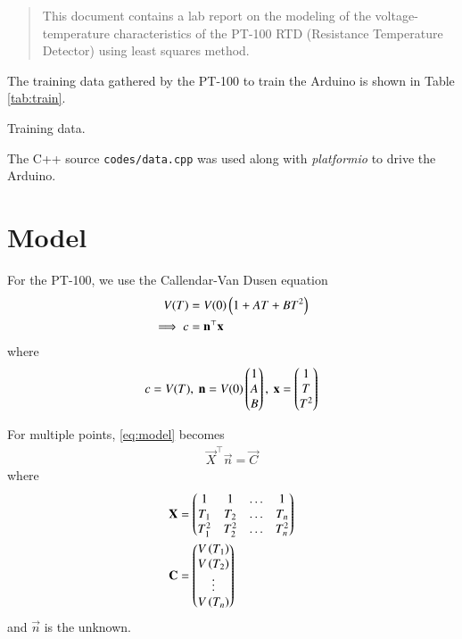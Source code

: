 \documentclass[journal,12pt,twocolumn]{IEEEtran}
\begin{document}
\begin{abstract}
    This document contains a lab report on the modeling of the voltage-temperature
    characteristics of the PT-100 RTD (Resistance Temperature Detector) using
    least squares method.
\end{abstract}

The training data gathered by the PT-100 to train the Arduino is shown in Table 
\ref{tab:train}.

\begin{table}[!ht]
    \centering
    
    \caption{Training data.}
    \label{tab:train}
\end{table}

The C++ source \texttt{codes/data.cpp} was used along with \textit{platformio}
to drive the Arduino.

\section{Model}

For the PT-100, we use the Callendar-Van Dusen equation
\begin{align}
    V(T) &= V(0)\left(1+AT+BT^2\right) \\
    \implies c &= \boldsymbol{\mathbf{n}}^\top\boldsymbol{\mathbf{x}} \label{eq:model}
\end{align}
where
\begin{align}
    c = V(T),\ \boldsymbol{\mathbf{n}} = V(0)\begin{pmatrix}1\\A\\B\end{pmatrix},\ \boldsymbol{\mathbf{x}} = \begin{pmatrix}1\\T\\T^2\end{pmatrix}
    \label{eq:x-y-theta-def}
\end{align}

For multiple points, \eqref{eq:model} becomes
\begin{align}
    \vec{X}^\top\vec{n} = \vec{C}
    \label{eq:lsq-eqn}
\end{align}
where
\begin{align}
    \boldsymbol{\mathbf{X}} &= \begin{pmatrix}1&1&\ldots&1\\T_1&T_2&\ldots&T_n\\T_1^2&T_2^2&\ldots&T_n^2\end{pmatrix} \\
    \boldsymbol{\mathbf{C}} &= \begin{pmatrix}V\left(T_1\right)\\V\left(T_2\right)\\\vdots\\V\left(T_n\right)\end{pmatrix}
\end{align}
and $\vec{n}$ is the unknown.
\end{document}
